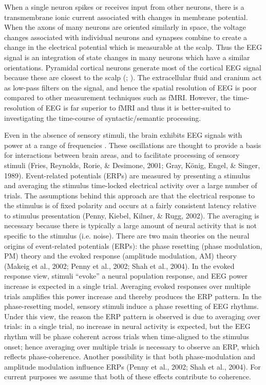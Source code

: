When a single neuron spikes or receives input from other neurons, there is a transmembrane ionic current associated with changes in membrane potential. When the axons of many neurons are oriented similarly in space, the voltage changes associated with individual neurons and synapses combine to create a change in the electrical potential which is measurable at the scalp. Thus the EEG signal is an integration of state changes in many neurons which have a similar orientations. Pyramidal cortical neurons generate most of the cortical EEG signal because these are closest to the scalp (\citealt{FedermeierLaszlo2009}; \citealt{KutasDale1997}). The extracellular fluid and cranium act as low-pass filters on the signal, and hence the spatial resolution of EEG is poor compared to other measurement techniques such as fMRI. However, the time-resolution of EEG is far superior to fMRI and thus it is better-suited to investigating the time-course of syntactic/semantic processing. 

Even in the absence of sensory stimuli, the brain exhibits EEG signals with power at a range of frequencies \citep{Buzsaki2006}. These oscillations are thought to provide a basis for interactions between brain areas, and to facilitate processing of sensory stimuli (Fries, Reynolds, Rorie, \& Desimone, 2001; Gray, König, Engel, \& Singer, 1989). Event-related potentials (ERPs) are measured by presenting a stimulus and averaging the stimulus time-locked electrical activity over a large number of trials. The assumptions behind this approach are that the electrical response to the stimulus is of fixed polarity and occurs at a fairly consistent latency relative to stimulus presentation (Penny, Kiebel, Kilner, \& Rugg, 2002). The averaging is necessary because there is typically a large amount of neural activity that is not specific to the stimulus (i.e. noise). There are two main theories on the neural origins of event-related potentials (ERPs): the phase resetting (phase modulation, PM) theory and the evoked response (amplitude modulation, AM) theory (Makeig et al., 2002; Penny et al., 2002; Shah et al., 2004). In the evoked response view, stimuli “evoke” a neural population response, and EEG power increase is expected in a single trial. Averaging evoked responses over multiple trials amplifies this power increase and thereby produces the ERP pattern. In the phase-resetting model, sensory stimuli induce a phase resetting of EEG rhythms. Under this view, the reason the ERP pattern is observed is due to averaging over trials: in a single trial, no increase in neural activity is expected, but the EEG rhythm will be phase coherent across trials when time-aligned to the stimulus onset; hence averaging over multiple trials is necessary to observe an ERP, which reflects phase-coherence. Another possibility is that both phase-modulation and amplitude modulation influence ERPs (Penny et al., 2002; Shah et al., 2004). For current purposes we assume that both of these effects contribute to coherence. 


